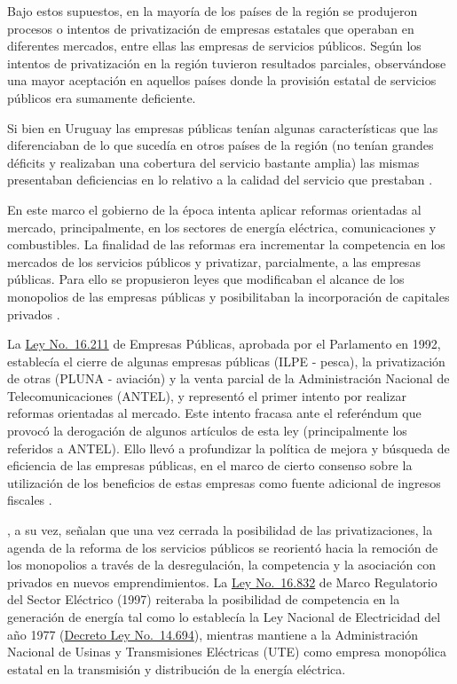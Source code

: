 \documentclass[
  12pt,
  spanish,
]{book}
\begin{document}
Bajo estos supuestos, en la mayoría de los países de la región se produjeron procesos o intentos de privatización de empresas estatales que operaban en diferentes mercados, entre ellas las empresas de servicios públicos. Según \citet{Bergara2005} los intentos de privatización en la región tuvieron resultados parciales, observándose una mayor aceptación en aquellos países donde la provisión estatal de servicios públicos era sumamente deficiente.

Si bien en Uruguay las empresas públicas tenían algunas características que las diferenciaban de lo que sucedía en otros países de la región (no tenían grandes déficits y realizaban una cobertura del servicio bastante amplia) las mismas presentaban deficiencias en lo relativo a la calidad del servicio que prestaban \citep{Forteza2003}.

En este marco el gobierno de la época intenta aplicar reformas orientadas al mercado, principalmente, en los sectores de energía eléctrica, comunicaciones y combustibles. La finalidad de las reformas era incrementar la competencia en los mercados de los servicios públicos y privatizar, parcialmente, a las empresas públicas. Para ello se propusieron leyes que modificaban el alcance de los monopolios de las empresas públicas y posibilitaban la incorporación de capitales privados \citep{Bergara2005}.

La \href{http://www.parlamento.gub.uy/leyes/ley16211.htm}{Ley No.~16.211} de Empresas Públicas, aprobada por el Parlamento en 1992, establecía el cierre de algunas empresas públicas (ILPE - pesca), la privatización de otras (PLUNA - aviación) y la venta parcial de la Administración Nacional de Telecomunicaciones (ANTEL), y representó el primer intento por realizar reformas orientadas al mercado. Este intento fracasa ante el referéndum que provocó la derogación de algunos artículos de esta ley (principalmente los referidos a ANTEL). Ello llevó a profundizar la política de mejora y búsqueda de eficiencia de las empresas públicas, en el marco de cierto consenso sobre la utilización de los beneficios de estas empresas como fuente adicional de ingresos fiscales \citep{Bergara2005}.

\citet{Forteza2003}, a su vez, señalan que una vez cerrada la posibilidad de las privatizaciones, la agenda de la reforma de los servicios públicos se reorientó hacia la remoción de los monopolios a través de la desregulación, la competencia y la asociación con privados en nuevos emprendimientos. La \href{https://www.impo.com.uy/bases/leyes/16832-1997}{Ley No.~16.832} de Marco Regulatorio del Sector Eléctrico (1997) reiteraba la posibilidad de competencia en la generación de energía tal como lo establecía la Ley Nacional de Electricidad del año 1977 (\href{https://www.impo.com.uy/bases/decretos-ley/14694-1977}{Decreto Ley No.~14.694}), mientras mantiene a la Administración Nacional de Usinas y Transmisiones Eléctricas (UTE) como empresa monopólica estatal en la transmisión y distribución de la energía eléctrica.
\end{document}
